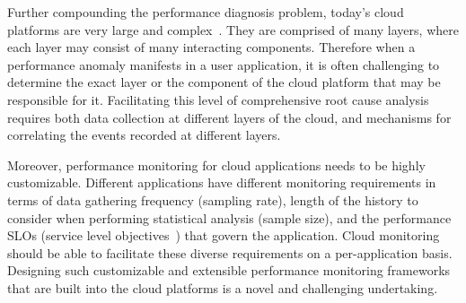 %

Further compounding the performance
diagnosis problem, today's cloud platforms are very 
large and complex~\cite{DaCunhaRodrigues:2016:MCC:2851613.2851619,Ibidunmoye:2015:PAD:2808687.2791120}. 
They are
comprised of many layers, where each layer may consist of many interacting components.
Therefore when a performance anomaly manifests in a user application, it is
often challenging
to determine the exact layer or the component of the cloud platform that may be responsible for it. 
Facilitating this level of comprehensive root cause analysis requires
both data collection at different layers of the cloud, and mechanisms for correlating 
the events recorded at different layers. 
%
%

Moreover, performance monitoring for cloud applications needs to be highly customizable. Different
applications have different monitoring requirements in terms of data gathering frequency (sampling rate), 
length of the history to consider when performing statistical analysis (sample size), and the performance 
SLOs (service level objectives~\cite{Keller:2003:WFS:635430.635442}) that govern the application.
Cloud monitoring should be able to facilitate these diverse requirements on a
per-application basis.
Designing such customizable and extensible performance
monitoring frameworks that are built into the cloud platforms is a novel and challenging undertaking.

